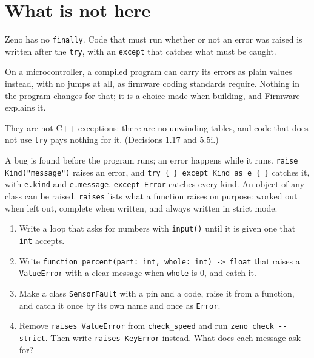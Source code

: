 \section{What is not here}

Zeno has no \verb|finally|. Code that must run whether or not an error
was raised is written after the \verb|try|, with an \verb|except| that
catches what must be caught.

On a microcontroller, a compiled program can carry its errors as plain
values instead, with no jumps at all, as firmware coding standards
require. Nothing in the program changes for that; it is a choice made
when building, and \hyperref[ch-firmware]{Firmware} explains it.

\begin{why}
They are not C++ exceptions: there are no unwinding tables, and code
that does not use \verb|try| pays nothing for it. (Decisions 1.17 and
5.5i.)
\end{why}

\begin{summary}
A bug is found before the program runs; an error happens while it
runs. \verb|raise Kind("message")| raises an error, and
\verb|try { } except Kind as e { }| catches it, with \verb|e.kind| and
\verb|e.message|. \verb|except Error| catches every kind. An object of
any class can be raised. \verb|raises| lists what a function raises on
purpose: worked out when left out, complete when written, and always
written in strict mode.
\end{summary}

\begin{tryit}
\begin{enumerate}
\item Write a loop that asks for numbers with \verb|input()| until it
  is given one that \verb|int| accepts.
\item Write \verb|function percent(part: int, whole: int) -> float|
  that raises a \verb|ValueError| with a clear message when
  \verb|whole| is 0, and catch it.
\item Make a class \verb|SensorFault| with a pin and a code, raise it
  from a function, and catch it once by its own name and once as
  \verb|Error|.
\item Remove \verb|raises ValueError| from \verb|check_speed| and run
  \verb|zeno check --strict|. Then write \verb|raises KeyError|
  instead. What does each message ask for?
\end{enumerate}
\end{tryit}
